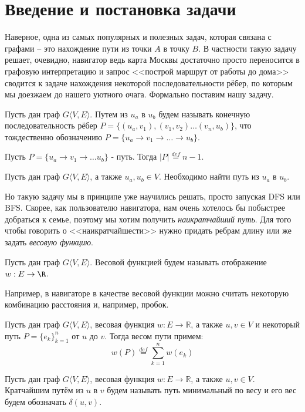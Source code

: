 
\section{Введение и постановка задачи}

Наверное, одна из самых популярных и полезных задач, которая связана с графами -- это нахождение пути из точки $A$ в точку $B$. В частности такую задачу решает, очевидно, навигатор ведь карта Москвы достаточно просто переносится в графовую интерпретацию и запрос <<построй маршрут от работы до дома>> сводится к задаче нахождения некоторой последовательности рёбер, по которым мы доезжаем до нашего уютного очага. Формально поставим нашу задачу.

\Def Пусть дан граф $G \langle V, E \rangle$. Путем из $u_a$ в $u_b$ будем называть конечную последовательность рёбер $P = \{(u_a, v_1), (v_1, v_2) \dots (v_n, u_b) \}$, что тождественно обозначению $P = \{ u_a \to v_1 \to \dots \to u_b \}$.

\Def Пусть $P = \{ u_a \to v_1 \to \dots u_b \}$ - путь. Тогда $|P| \overset{def}{=} n - 1$.

\Task Пусть дан граф $G \langle V, E \rangle$, а также $u_a, u_b \in V$. Необходимо найти путь из $u_a$ в $u_b$.

Но такую задачу мы в принципе уже научились решать, просто запуская DFS или BFS. Скорее, как пользователю навигатора, нам очень хотелось бы побыстрее добраться к семье, поэтому мы хотим получить \textit{наикратчайший путь}. Для того чтобы говорить о <<наикратчайшести>> нужно придать ребрам длину или же задать \textit{весовую функцию}.

\Def Пусть дан граф $G \langle V, E \rangle$. Весовой функцией будем называть отображение $w: E \to \R$.

Например, в навигаторе в качестве весовой функции можно считать некоторую комбинацию расстояния и, например, пробок.

\Def Пусть дан граф $G \langle V, E \rangle$, весовая функция $w: E \to \mathbb{R}$, а также $u, v \in V$ и некоторый путь $P = \{e_k\}_{k=1}^n$ от $u$ до $v$. Тогда весом пути примем: 
\begin{equation*}
    w(P) \overset{def}{=} \sum\limits_{k = 1}^n w(e_k)
\end{equation*}

\Def Пусть дан граф $G \langle V, E \rangle$, весовая функция $w: E \to \mathbb{R}$, а также $u, v \in V$. Кратчайшим путём из $u$ в $v$ будем называть путь минимальный по весу и его вес будем обозначать $\delta(u, v)$.

